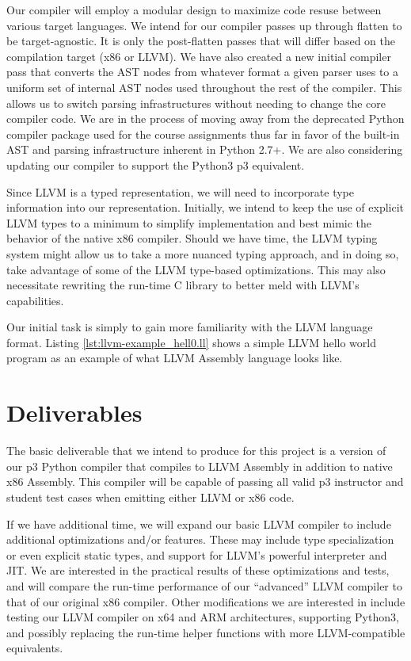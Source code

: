\documentclass[11pt]{article}
\begin{document}
Our compiler will employ a modular design to maximize code resuse between
various target languages. 
We intend for our compiler passes up through flatten to be
target-agnostic. It is only the post-flatten passes that will differ
based on the compilation target (x86 or LLVM). We have also created a
new initial compiler pass that converts the AST nodes from whatever
format a given parser uses to a uniform set of internal AST nodes used throughout
the rest of the compiler. This allows us to switch parsing
infrastructures without needing to change the core compiler code. We are
in the process of moving away from the deprecated Python compiler package used
for the course assignments thus far in
favor of the built-in AST and parsing infrastructure inherent in Python
2.7+. We are also considering updating our compiler to support the
Python3 p3 equivalent.

Since LLVM is a typed representation, we will need to incorporate
type information into our representation. Initially, we intend to keep
the use of explicit LLVM types to a minimum to simplify implementation
and best mimic the behavior of the native x86 compiler. Should we have
time, the LLVM typing system might allow us to take a more nuanced
typing approach, and in doing so, take advantage of some of the LLVM
type-based optimizations. This may also necessitate rewriting the run-time
C library to better meld with LLVM's capabilities.

Our initial task is simply to gain more familiarity with the LLVM language
format. Listing \ref{lst:llvm-example_hell0.ll} shows
a simple LLVM hello world program as an example of
what LLVM Assembly language looks like.



\section{Deliverables}

The basic deliverable that we intend to produce for this project is a
version of our p3 Python compiler that compiles to LLVM Assembly
in addition to native x86 Assembly. This compiler will be capable of
passing all valid p3 instructor and student test cases when emitting either
LLVM or x86 code.

If we have additional time, we will expand our basic LLVM compiler
to include additional optimizations and/or features. These
may include type specialization or even explicit static types, and
support for LLVM's powerful interpreter and JIT.
We are interested in the practical results of these
optimizations and tests, and will compare the run-time performance of
our ``advanced'' LLVM
compiler to that of our original x86 compiler. Other modifications we are interested
in include testing our LLVM compiler on x64 and ARM
architectures, supporting Python3, and possibly replacing the run-time
helper functions with more LLVM-compatible equivalents.

\nocite{*}
\printbibliography
\end{document}
